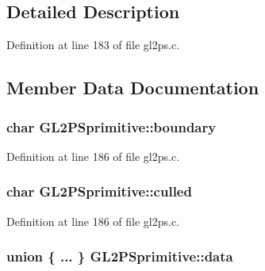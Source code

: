 \subsection{Detailed Description}


Definition at line 183 of file gl2ps.\+c.



\subsection{Member Data Documentation}
\hypertarget{struct_g_l2_p_sprimitive_a1888e49651c47c98848b80287eeb6ab1}{}
\subsubsection[{boundary}]{\setlength{\rightskip}{0pt plus 5cm}char G\+L2\+P\+Sprimitive\+::boundary}\label{struct_g_l2_p_sprimitive_a1888e49651c47c98848b80287eeb6ab1}


Definition at line 186 of file gl2ps.\+c.

\hypertarget{struct_g_l2_p_sprimitive_a4df4eaa4723bf58404efa81e600a8fc9}{}
\subsubsection[{culled}]{\setlength{\rightskip}{0pt plus 5cm}char G\+L2\+P\+Sprimitive\+::culled}\label{struct_g_l2_p_sprimitive_a4df4eaa4723bf58404efa81e600a8fc9}


Definition at line 186 of file gl2ps.\+c.

\hypertarget{struct_g_l2_p_sprimitive_a2c12b330fa11b03312e248a8864099b5}{}
\subsubsection[{data}]{\setlength{\rightskip}{0pt plus 5cm}union \{ ... \}   G\+L2\+P\+Sprimitive\+::data}\label{struct_g_l2_p_sprimitive_a2c12b330fa11b03312e248a8864099b5}
\hypertarget{struct_g_l2_p_sprimitive_a668f776cc038ba6697fb3a59ac9808d8}{}
